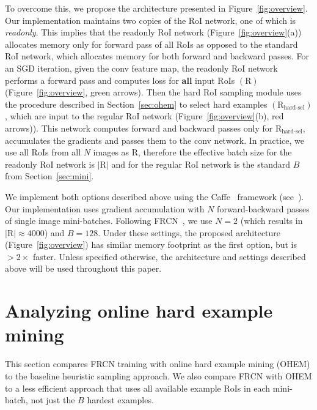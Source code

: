 \documentclass[10pt,twocolumn,letterpaper]{article}
\begin{document}
To overcome this, we propose the architecture presented in Figure~\ref{fig:overview}. Our implementation maintains two copies of the RoI network, one of which is \emph{readonly}. This implies that the readonly RoI network (Figure~\ref{fig:overview}(a)) allocates memory only for forward pass of all RoIs as opposed to the standard RoI network, which allocates memory for both forward and backward passes. For an SGD iteration, given the conv feature map, the readonly RoI network performs a  forward pass and computes loss for \textbf{all} input RoIs $\left(\mathrm{R}\right)$ (Figure~\ref{fig:overview}, {\color{green} green} arrows). Then the hard RoI sampling module uses the procedure described in Section~\ref{sec:ohem} to select hard examples $\left(\mathrm{R_\text{hard-sel}}\right)$, which are input to the regular RoI network (Figure~\ref{fig:overview}(b), {\color{red} red} arrows)). This network computes forward and backward passes only for $\mathrm{R_\text{hard-sel}}$, accumulates the gradients and passes them to the conv network. In practice, we use all RoIs from all $N$ images as $\mathrm{R}$, therefore the effective batch size for the readonly RoI network is $|\mathrm{R}|$ and for the regular RoI network is the standard $B$ from Section~\ref{sec:mini}.

We implement both options described above using the Caffe~\cite{caffe} framework (see~\cite{frcn}). Our implementation uses gradient accumulation with $N$ forward-backward passes of single image mini-batches. Following FRCN~\cite{frcn}, we use $N=2$ (which results in $|\mathrm{R}| \approx 4000$) and $B=128$. Under these settings, the proposed architecture (Figure~\ref{fig:overview}) has similar memory footprint as the first option, but is $>2\times$ faster. Unless specified otherwise, the architecture and settings described above will be used throughout this paper.





\vspace{-0.05in}
\section{\label{sec:analyze}Analyzing online hard example mining}
\vspace{-0.03in}
This section compares FRCN training with online hard example mining (OHEM) to the baseline heuristic sampling approach. We also compare FRCN with OHEM to a less efficient approach that uses all available example RoIs in each mini-batch, not just the $B$ hardest examples.
\end{document}

